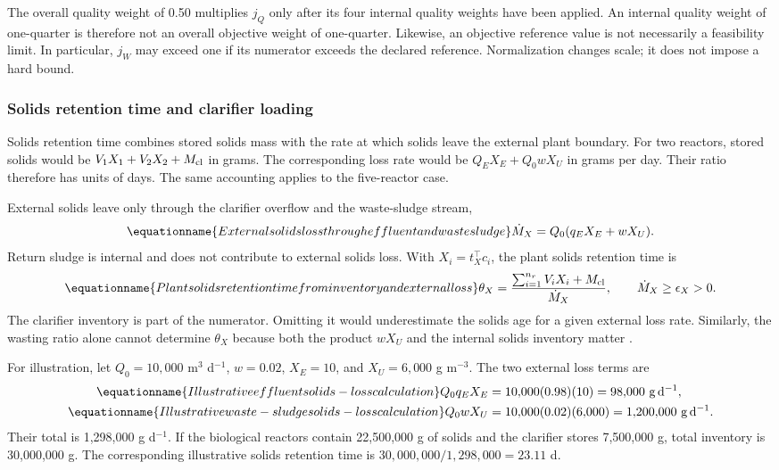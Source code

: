 The overall quality weight of 0.50 multiplies $j_Q$ only after its four internal quality weights have been applied. An internal quality weight of one-quarter is therefore not an overall objective weight of one-quarter. Likewise, an objective reference value is not necessarily a feasibility limit. In particular, $j_W$ may exceed one if its numerator exceeds the declared reference. Normalization changes scale; it does not impose a hard bound.

\subsubsection{Solids retention time and clarifier loading}

Solids retention time combines stored solids mass with the rate at which solids leave the external plant boundary. For two reactors, stored solids would be $V_1X_1+V_2X_2+M_{\rm cl}$ in grams. The corresponding loss rate would be $Q_EX_E+Q_0wX_U$ in grams per day. Their ratio therefore has units of days. The same accounting applies to the five-reactor case.

External solids leave only through the clarifier overflow and the waste-sludge stream,
\begin{equation}
\equationname{External solids loss through effluent and waste sludge}
\dot M_X=Q_0(q_EX_E+wX_U).
\label{eq:plant_external_solids_loss}
\end{equation}
Return sludge is internal and does not contribute to external solids loss. With $X_i=t_X^\top c_i$, the plant solids retention time is
\begin{equation}
\equationname{Plant solids retention time from inventory and external loss}
\theta_X=\frac{\sum_{i=1}^{n_r}V_iX_i+M_{\rm cl}}{\dot M_X},
\qquad\dot M_X\ge\epsilon_X>0.
\label{eq:plant_solids_age}
\end{equation}
The clarifier inventory is part of the numerator. Omitting it would underestimate the solids age for a given external loss rate. Similarly, the wasting ratio alone cannot determine $\theta_X$ because both the product $wX_U$ and the internal solids inventory matter \citep{Alex2008}.

For illustration, let $Q_0=10{,}000$ m$^3$ d$^{-1}$, $w=0.02$, $X_E=10$, and $X_U=6{,}000$ g m$^{-3}$. The two external loss terms are
\begin{align}
\equationname{Illustrative effluent solids-loss calculation}
Q_0q_EX_E&=10{,}000(0.98)(10)=98{,}000\ \mathrm{g\,d^{-1}},\\
\equationname{Illustrative waste-sludge solids-loss calculation}
Q_0wX_U&=10{,}000(0.02)(6{,}000)=1{,}200{,}000\ \mathrm{g\,d^{-1}}.
\end{align}
Their total is 1{,}298{,}000 g d$^{-1}$. If the biological reactors contain 22{,}500{,}000 g of solids and the clarifier stores 7{,}500{,}000 g, total inventory is 30{,}000{,}000 g. The corresponding illustrative solids retention time is $30{,}000{,}000/1{,}298{,}000=23.11$ d.

